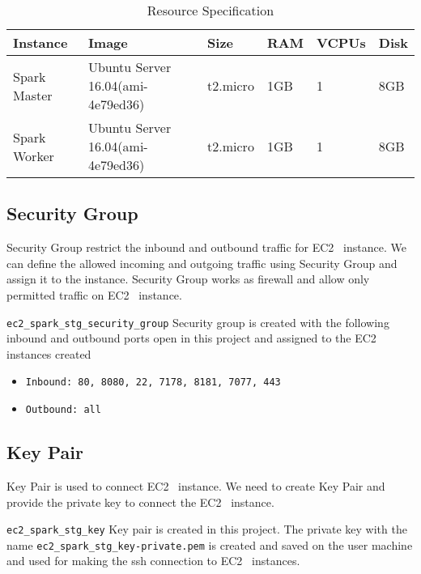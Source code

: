 \begin{table}[]
	\centering \caption{Resource
	Specification} \label{t:resource-specification} \begin{tabular}{|l|l|l|l|l|l|} \hline \textbf{Instance}
	& \textbf{Image} & \textbf{Size} & \textbf{RAM}
	& \textbf{VCPUs} & \textbf{Disk} \\ \hline Spark Master & Ubuntu
	Server 16.04(ami-4e79ed36) & t2.micro & 1GB & 1 &
	8GB \\ \hline Spark Worker & Ubuntu Server 16.04(ami-4e79ed36) &
	t2.micro & 1GB & 1 & 8GB \\ \hline \end{tabular}
\end{table}

\subsection{Security Group}

Security Group restrict the inbound and outbound traffic for
EC2~\cite{hid-sp18-511-www-ec2} instance.  We can define the allowed
incoming and outgoing traffic using Security Group and assign it to
the instance.  Security Group works as firewall and allow only
permitted traffic on EC2~\cite{hid-sp18-511-www-ec2} instance.

\verb|ec2_spark_stg_security_group| Security group is created with the
following inbound and outbound ports open in this project and assigned to the
EC2~\cite{hid-sp18-511-www-ec2} instances created

\begin{itemize}
	\item \verb|Inbound: 80, 8080, 22, 7178, 8181, 7077, 443|
	\item \verb|Outbound: all|
	
\end{itemize}

\subsection{Key Pair}

Key Pair is used to connect EC2~\cite{hid-sp18-511-www-ec2}
instance. We need to create Key Pair and provide the private key to
connect the EC2~\cite{hid-sp18-511-www-ec2} instance.

\verb|ec2_spark_stg_key| Key pair is created in this project.
The private key with the name \verb|ec2_spark_stg_key-private.pem| is
created and saved on the user machine and used for making the ssh connection to
EC2~\cite{hid-sp18-511-www-ec2} instances.

